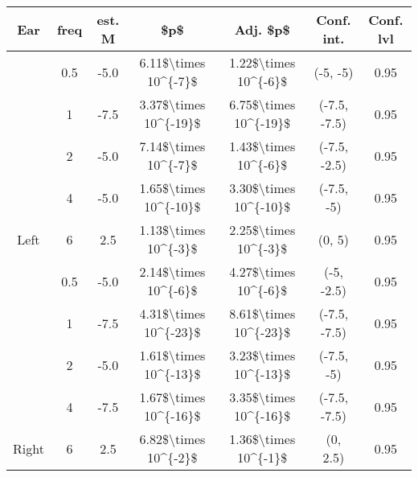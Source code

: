 
\begin{tabular}[t]{ccccccc}
\toprule
Ear & freq & est. M & \$p\$ & Adj. \$p\$ & Conf. int. & Conf. lvl\\
\midrule
 & 0.5 & -5.0 & 6.11\$\textbackslash{}times 10\textasciicircum{}\{-7\}\$ & 1.22\$\textbackslash{}times 10\textasciicircum{}\{-6\}\$ & (-5, -5) & 0.95\\

 & 1 & -7.5 & 3.37\$\textbackslash{}times 10\textasciicircum{}\{-19\}\$ & 6.75\$\textbackslash{}times 10\textasciicircum{}\{-19\}\$ & (-7.5, -7.5) & 0.95\\

 & 2 & -5.0 & 7.14\$\textbackslash{}times 10\textasciicircum{}\{-7\}\$ & 1.43\$\textbackslash{}times 10\textasciicircum{}\{-6\}\$ & (-7.5, -2.5) & 0.95\\

 & 4 & -5.0 & 1.65\$\textbackslash{}times 10\textasciicircum{}\{-10\}\$ & 3.30\$\textbackslash{}times 10\textasciicircum{}\{-10\}\$ & (-7.5, -5) & 0.95\\

\multirow{-5}{*}{\centering\arraybackslash Left} & 6 & 2.5 & 1.13\$\textbackslash{}times 10\textasciicircum{}\{-3\}\$ & 2.25\$\textbackslash{}times 10\textasciicircum{}\{-3\}\$ & (0, 5) & 0.95\\
\cmidrule{1-7}
 & 0.5 & -5.0 & 2.14\$\textbackslash{}times 10\textasciicircum{}\{-6\}\$ & 4.27\$\textbackslash{}times 10\textasciicircum{}\{-6\}\$ & (-5, -2.5) & 0.95\\

 & 1 & -7.5 & 4.31\$\textbackslash{}times 10\textasciicircum{}\{-23\}\$ & 8.61\$\textbackslash{}times 10\textasciicircum{}\{-23\}\$ & (-7.5, -7.5) & 0.95\\

 & 2 & -5.0 & 1.61\$\textbackslash{}times 10\textasciicircum{}\{-13\}\$ & 3.23\$\textbackslash{}times 10\textasciicircum{}\{-13\}\$ & (-7.5, -5) & 0.95\\

 & 4 & -7.5 & 1.67\$\textbackslash{}times 10\textasciicircum{}\{-16\}\$ & 3.35\$\textbackslash{}times 10\textasciicircum{}\{-16\}\$ & (-7.5, -7.5) & 0.95\\

\multirow{-5}{*}{\centering\arraybackslash Right} & 6 & 2.5 & 6.82\$\textbackslash{}times 10\textasciicircum{}\{-2\}\$ & 1.36\$\textbackslash{}times 10\textasciicircum{}\{-1\}\$ & (0, 2.5) & 0.95\\
\bottomrule
\end{tabular}
